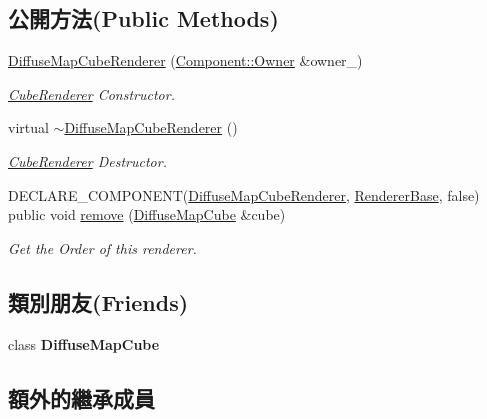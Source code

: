 \subsection*{公開方法(Public Methods)}
\begin{DoxyCompactItemize}
\item 
\hyperlink{class_magnum_1_1_diffuse_map_cube_renderer_a5f354147fc558a450f2105f76878e161}{Diffuse\+Map\+Cube\+Renderer} (\hyperlink{class_magnum_1_1_component_1_1_owner}{Component\+::\+Owner} \&owner\+\_\+)
\begin{DoxyCompactList}\small\item\em \hyperlink{class_magnum_1_1_cube_renderer}{Cube\+Renderer} Constructor. \end{DoxyCompactList}\item 
virtual \hyperlink{class_magnum_1_1_diffuse_map_cube_renderer_a1fcdee05814bfb6473f614c1fdacbeb3}{$\sim$\+Diffuse\+Map\+Cube\+Renderer} ()
\begin{DoxyCompactList}\small\item\em \hyperlink{class_magnum_1_1_cube_renderer}{Cube\+Renderer} Destructor. \end{DoxyCompactList}\item 
D\+E\+C\+L\+A\+R\+E\+\_\+\+C\+O\+M\+P\+O\+N\+E\+NT(\hyperlink{class_magnum_1_1_diffuse_map_cube_renderer}{Diffuse\+Map\+Cube\+Renderer}, \hyperlink{class_magnum_1_1_renderer_base}{Renderer\+Base}, false) public void \hyperlink{class_magnum_1_1_diffuse_map_cube_renderer_ac02b3206600e1825d321e213d96bcf81}{remove} (\hyperlink{class_magnum_1_1_diffuse_map_cube}{Diffuse\+Map\+Cube} \&cube)
\begin{DoxyCompactList}\small\item\em Get the Order of this renderer. \end{DoxyCompactList}\end{DoxyCompactItemize}
\subsection*{類別朋友(Friends)}
\begin{DoxyCompactItemize}
\item 
class {\bfseries Diffuse\+Map\+Cube}\hypertarget{class_magnum_1_1_diffuse_map_cube_renderer_abcb980013131fdebc47def4ff1ba07aa}{}\label{class_magnum_1_1_diffuse_map_cube_renderer_abcb980013131fdebc47def4ff1ba07aa}

\end{DoxyCompactItemize}
\subsection*{額外的繼承成員}


